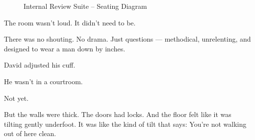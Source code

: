 \medskip

\begin{figure}[H]
  \centering
  \begin{adjustbox}{width=0.9\linewidth}
  \end{adjustbox}
  \caption{Internal Review Suite -- Seating Diagram}
\end{figure}

\medskip

The room wasn’t loud. It didn’t need to be.

There was no shouting. No drama. Just questions — methodical, unrelenting, and designed to wear a man down by inches.

David adjusted his cuff.

He wasn’t in a courtroom.

Not yet.

But the walls were thick. The doors had locks. And the floor felt like it was tilting gently underfoot. It was like 
the kind of tilt that says: You’re not walking out of here clean.

\medskip


